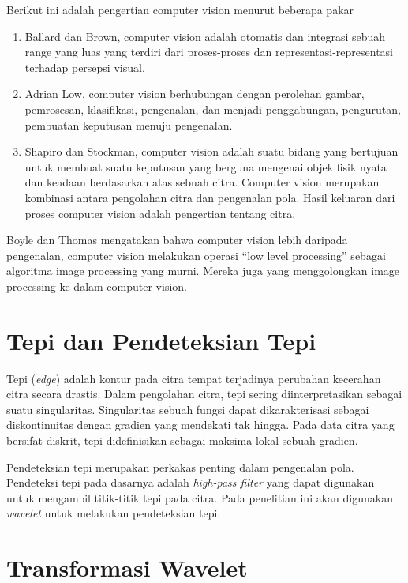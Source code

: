 \documentclass[laporan.tex]{subfiles}
\begin{document}
Berikut ini adalah pengertian computer vision menurut beberapa pakar

\begin{enumerate}
\item Ballard dan Brown, computer vision adalah otomatis dan integrasi sebuah range yang luas yang terdiri dari proses-proses dan representasi-representasi terhadap persepsi visual.
\item Adrian Low, computer vision berhubungan dengan perolehan gambar, pemrosesan, klasifikasi, pengenalan, dan menjadi penggabungan, pengurutan, pembuatan keputusan menuju pengenalan.
\item Shapiro dan Stockman, computer vision adalah suatu bidang yang bertujuan untuk membuat suatu keputusan yang berguna mengenai objek fisik nyata dan keadaan berdasarkan atas sebuah citra. Computer vision merupakan kombinasi antara pengolahan citra dan pengenalan pola. Hasil keluaran dari proses computer vision adalah pengertian tentang citra.
\end{enumerate}

Boyle dan Thomas mengatakan bahwa computer vision lebih daripada pengenalan, computer vision melakukan operasi “low level processing” sebagai algoritma image processing yang murni. Mereka juga yang menggolongkan image processing ke dalam computer vision.

\section{Tepi dan Pendeteksian Tepi}

Tepi (\emph{edge}) adalah kontur pada citra tempat terjadinya perubahan kecerahan citra secara drastis. Dalam pengolahan citra, tepi sering diinterpretasikan sebagai suatu singularitas. Singularitas sebuah fungsi dapat dikarakterisasi sebagai diskontinuitas dengan gradien yang mendekati tak hingga. Pada data citra yang bersifat diskrit, tepi didefinisikan sebagai maksima lokal sebuah gradien.

Pendeteksian tepi merupakan perkakas penting dalam pengenalan pola. Pendeteksi tepi pada dasarnya adalah \emph{high-pass filter} yang dapat digunakan untuk mengambil titik-titik tepi pada citra. Pada penelitian ini akan digunakan \emph{wavelet} untuk melakukan pendeteksian tepi.

\section{Transformasi Wavelet}
\end{document}
